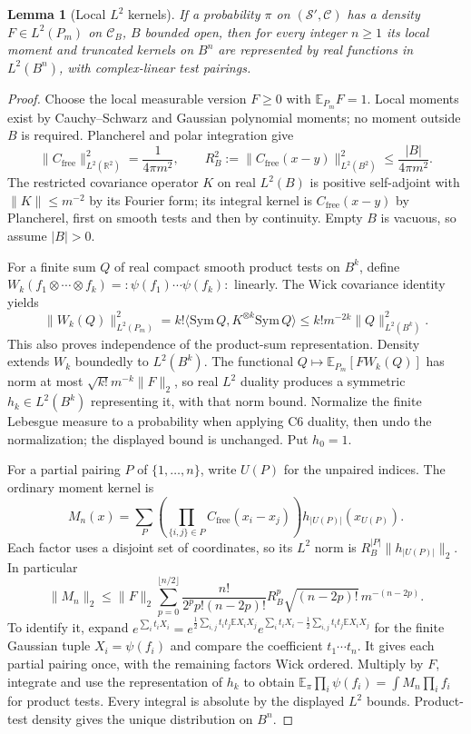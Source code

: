 \documentclass[11pt]{article}
\theoremstyle{plain}
\newtheorem{lemma}[theorem]{Lemma}
\theoremstyle{definition}
\theoremstyle{remark}
\newcommand{\R}{\mathbb{R}}
\newcommand{\E}{\mathbb{E}}
\newcommand{\cC}{\mathcal{C}}
\newcommand{\cS}{\mathcal{S}}
\newcommand{\Cfree}{C_{\mathrm{free}}}
\begin{document}
\begin{lemma}[Local $L^2$ kernels]\label{lem:kernels}
If a probability $\pi$ on $(\cS',\cC)$ has a density
$F\in L^2(P_m)$ on $\cC_B$, $B$ bounded open, then for every integer
$n\ge1$ its local moment and truncated kernels on $B^n$ are represented
by real functions in $L^2(B^n)$, with complex-linear test pairings.
\end{lemma}
\begin{proof}
Choose the local measurable version $F\ge0$ with $\E_{P_m}F=1$.
Local moments exist by Cauchy--Schwarz and Gaussian polynomial moments;
no moment outside $B$ is required. Plancherel and polar integration give
\begin{equation}\label{eq:local-covariance-L2}
 \|\Cfree\|_{L^2(\R^2)}^2=\frac1{4\pi m^2},\qquad
 R_B^2:=\|\Cfree(x-y)\|_{L^2(B^2)}^2\le\frac{|B|}{4\pi m^2}.
\end{equation}
The restricted covariance operator $K$ on real $L^2(B)$ is positive
self-adjoint with $\|K\|\le m^{-2}$ by its Fourier form; its integral
kernel is $\Cfree(x-y)$ by Plancherel, first on smooth tests and then by
continuity. Empty $B$ is vacuous, so assume $|B|>0$.

For a finite sum $Q$ of real compact smooth product tests on $B^k$,
define $W_k(f_1\otimes\cdots\otimes f_k)={:}\psi(f_1)\cdots\psi(f_k){:}$
linearly. The Wick covariance identity yields
\begin{equation}\label{eq:local-Wick-map}
 \|W_k(Q)\|_{L^2(P_m)}^2
 =k!\langle\mathrm{Sym}\,Q,K^{\otimes k}\mathrm{Sym}\,Q\rangle
 \le k!m^{-2k}\|Q\|_{L^2(B^k)}^2.
\end{equation}
This also proves independence of the product-sum representation. Density
extends $W_k$ boundedly to $L^2(B^k)$. The functional
$Q\mapsto\E_{P_m}[FW_k(Q)]$ has norm at most
$\sqrt{k!}m^{-k}\|F\|_2$, so real $L^2$ duality produces a symmetric
$h_k\in L^2(B^k)$ representing it, with that norm bound. Normalize the
finite Lebesgue measure to a probability when applying C6 duality, then
undo the normalization; the displayed bound is unchanged. Put $h_0=1$.

For a partial pairing $P$ of $\{1,\ldots,n\}$, write $U(P)$ for the
unpaired indices. The ordinary moment kernel is
\begin{equation}\label{eq:local-moment-kernel}
 M_n(x)=\sum_P\left(\prod_{\{i,j\}\in P}\Cfree(x_i-x_j)\right)
              h_{|U(P)|}(x_{U(P)}).
\end{equation}
Each factor uses a disjoint set of coordinates, so its $L^2$ norm is
$R_B^{|P|}\|h_{|U(P)|}\|_2$. In particular
\[
 \|M_n\|_2\le\|F\|_2\sum_{p=0}^{\lfloor n/2\rfloor}
 \frac{n!}{2^pp!(n-2p)!}R_B^p\sqrt{(n-2p)!}\,m^{-(n-2p)}.
\]
To identify it, expand
$e^{\sum_i t_iX_i}=e^{\frac12\sum_{i,j}t_it_j\E X_iX_j}
 e^{\sum_i t_iX_i-\frac12\sum_{i,j}t_it_j\E X_iX_j}$ for the finite
Gaussian tuple $X_i=\psi(f_i)$ and compare the coefficient $t_1\cdots t_n$.
It gives each partial pairing once, with the remaining factors Wick ordered.
Multiply by $F$, integrate and use the representation of $h_k$ to obtain
$\E_\pi\prod_i\psi(f_i)=\int M_n\prod_i f_i$ for product tests.
Every integral is absolute by the displayed $L^2$ bounds. Product-test
density gives the unique distribution on $B^n$.


\end{proof}
\end{document}
